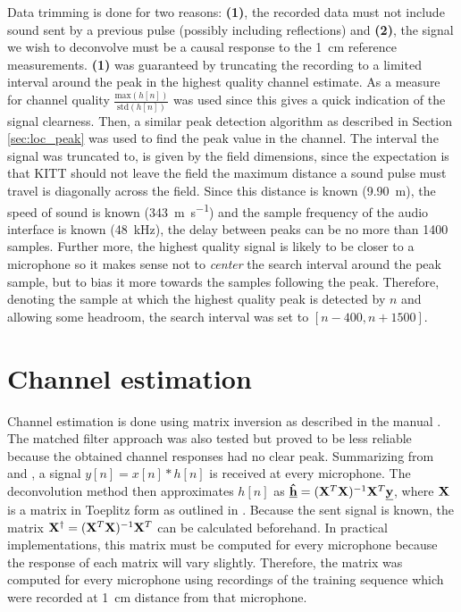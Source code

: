 \documentclass[11pt,titlepage]{report}
\begin{document}
Data trimming is done for two reasons: \textbf{(1)}, the recorded data must not include sound sent by a previous pulse (possibly including reflections) and \textbf{(2)}, the signal we wish to deconvolve must be a causal response to the \SI{1}{\centi\meter} reference measurements. \textbf{(1)} was guaranteed by truncating the recording to a limited interval around the peak in the highest quality channel estimate. As a measure for channel quality $\frac{\text{max}(h[n])}{\text{std}(h[n])}$ was used since this gives a quick indication of the signal clearness. Then, a similar peak detection algorithm as described in Section \ref{sec:loc_peak} was used to find the peak value in the channel. The interval the signal was truncated to, is given by the field dimensions, since the expectation is that KITT should not leave the field the maximum distance a sound pulse must travel is diagonally across the field. Since this distance is known (\SI{9.90}{\meter}), the speed of sound is known (\SI{343}{\meter\per\second}) and the sample frequency of the audio interface is known (\SI{48}{\kilo\hertz}), the delay between peaks can be no more than \num{1400} samples. Further more, the highest quality signal is likely to be closer to a microphone so it makes sense not to \textit{center} the search interval around the peak sample, but to bias it more towards the samples following the peak. Therefore, denoting the sample at which the highest quality peak is detected by $n$ and allowing some headroom, the search interval was set to $[n - 400, n + 1500]$.

\section{Channel estimation}
\label{sec:loc_est_h}
Channel estimation is done using matrix inversion as described in the manual \cite{epo4-manual}. The matched filter approach was also tested but proved to be less reliable because the obtained channel responses had no clear peak. Summarizing from \cite{epo4-manual} and \cite{epo4-del7}, a signal $y[n]=x[n]*h[n]$ is received at every microphone. The deconvolution method then approximates $h[n]$ as $\mathbf{\underline{\hat{h}}}=(\mathbf{X}^T\mathbf{X})^{-1}\mathbf{X}^T\mathbf{\underline{y}}$, where $\mathbf{X}$ is a matrix in Toeplitz form as outlined in \cite{epo4-manual}. Because the sent signal is known, the matrix $\mathbf{X}^\dagger=(\mathbf{X}^T\mathbf{X})^{-1}\mathbf{X}^T$ can be calculated beforehand. In practical implementations, this matrix must be computed for every microphone because the response of each matrix will vary slightly. Therefore, the matrix was computed for every microphone using recordings of the training sequence which were recorded at \SI{1}{cm} distance from that microphone.
\end{document}
